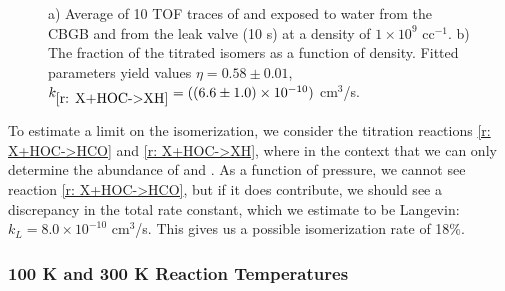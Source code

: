 \begin{figure}[H]
	\centering
	\caption{a) Average of 10 TOF traces of  and  exposed to water from the CBGB and  from the leak valve (10 s) at a density of $1 \times 10^9$ cc$^{-1}$. b) The fraction of the titrated isomers as a function of  density. Fitted parameters yield values $\eta = 0.58 \pm 0.01$, $k_{\ref{r: X+HOC->XH}} = ((6.6 \pm 1.0) \times 10^{-10})$ cm$^3$/s.}
	\label{fig: N2 pressure scan}
\end{figure}

To estimate a limit on the isomerization, we consider the titration reactions \ref{r: X+HOC->HCO} and \ref{r: X+HOC->XH}, where  in the context that we can only determine the abundance of \ce{[HCO]+} and . As a function of pressure, we cannot see reaction \ref{r: X+HOC->HCO}, but if it does contribute, we should see a discrepancy in the total rate constant, which we estimate to be Langevin: $k_L = 8.0 \times 10^{-10}$ cm$^3$/s. This gives us a possible isomerization rate of 18\%.

\subsubsection{100 K and 300 K Reaction Temperatures}

